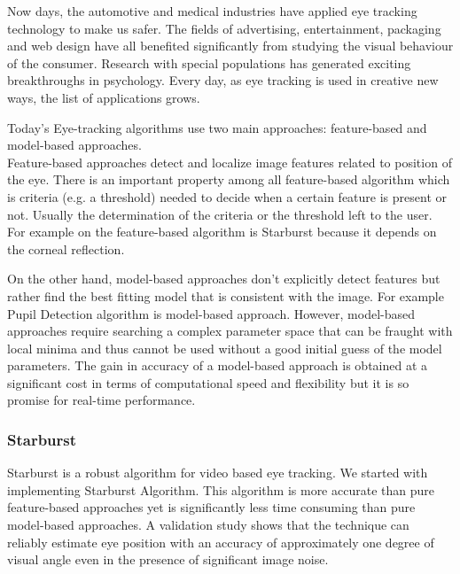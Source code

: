 Now days, the automotive and medical industries have applied eye tracking technology to make us safer. The fields of advertising, entertainment, packaging and web design have all benefited significantly from studying the visual behaviour of the consumer. Research with special populations has generated exciting breakthroughs in psychology. Every day, as eye tracking is used in creative new ways, the list of applications grows. \bigskip

Today's Eye-tracking algorithms use two main approaches: feature-based and model-based approaches. \bigskip \\
Feature-based approaches detect and localize image features related to position of the eye. There is an important property among all feature-based algorithm which is criteria (e.g. a threshold) needed to decide when a certain feature is present or not. Usually the determination of the criteria or the threshold left to the user. For example on the feature-based algorithm is Starburst because it depends on the corneal reflection. \bigskip \cite{starburst}

On the other hand, model-based approaches don't explicitly detect features but rather find the best fitting model that is consistent with the image. For example Pupil Detection algorithm is model-based approach. However, model-based approaches require searching a complex parameter space that can be fraught with local minima and thus cannot be used without a good initial guess of the model parameters. The gain in accuracy of a model-based approach is obtained at a significant cost in terms of computational speed and flexibility but it is so promise for real-time performance. \bigskip \cite{starburst}

 


\subsubsection{Starburst}
Starburst is a robust algorithm for video based eye tracking. We started with implementing Starburst Algorithm. This algorithm is more accurate than pure feature-based approaches yet is significantly less time consuming than pure model-based approaches. A validation study shows that the technique can reliably estimate eye position with an accuracy of approximately one degree of visual angle even in the presence of significant image noise. \bigskip

